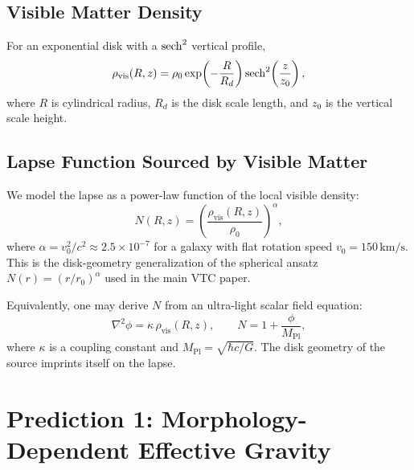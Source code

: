 \documentclass[11pt,a4paper]{article}
\theoremstyle{definition}
\newcommand{\vis}{\mathrm{vis}}
\newcommand{\Pl}{\mathrm{Pl}}
\begin{document}
\subsection{Visible Matter Density}

For an exponential disk with a $\sech^2$ vertical profile,
\begin{equation}
    \rho_{\vis}(R,z) = \rho_0\exp\!\left(-\frac{R}{R_d}\right)\sech^2\!\left(\frac{z}{z_0}\right),
\end{equation}
where $R$ is cylindrical radius, $R_d$ is the disk scale length, and $z_0$ is the vertical scale height.

\subsection{Lapse Function Sourced by Visible Matter}

We model the lapse as a power-law function of the local visible density:
\begin{equation}
    N(R,z) = \left(\frac{\rho_{\vis}(R,z)}{\rho_0}\right)^{\alpha},
\end{equation}
where $\alpha=v_0^2/c^2\approx 2.5\times 10^{-7}$ for a galaxy with flat rotation speed $v_0=150\,\mathrm{km/s}$. This is the disk-geometry generalization of the spherical ansatz $N(r)=(r/r_0)^\alpha$ used in the main VTC paper.

Equivalently, one may derive $N$ from an ultra-light scalar field equation:
\begin{equation}
    \nabla^2\phi = \kappa\,\rho_{\vis}(R,z),\qquad N=1+\frac{\phi}{M_{\Pl}},
\end{equation}
where $\kappa$ is a coupling constant and $M_{\Pl}=\sqrt{\hbar c/G}$. The disk geometry of the source imprints itself on the lapse.

\section{Prediction 1: Morphology-Dependent Effective Gravity}
\end{document}
